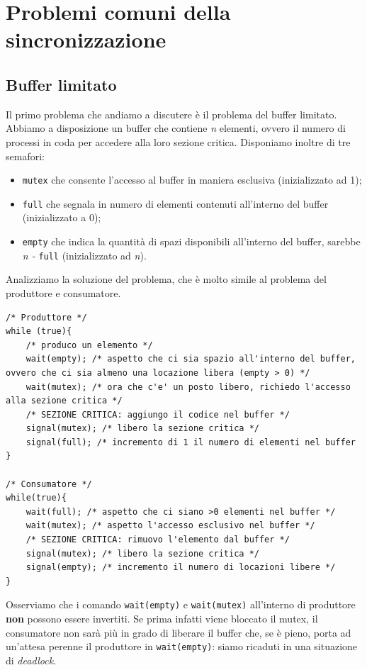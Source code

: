 \section{Problemi comuni della sincronizzazione}


\subsection{Buffer limitato}
Il primo problema che andiamo a discutere è il problema del buffer limitato. Abbiamo a disposizione un buffer che contiene \textit{n} elementi, ovvero il numero di processi in coda per accedere alla loro sezione critica. Disponiamo inoltre di tre semafori:
\vspace{-5px}
\begin{itemize}
\setlength{\itemsep}{-.15 em}
    \item \texttt{mutex} che consente l'accesso al buffer in maniera esclusiva (inizializzato ad 1);
    \item \texttt{full} che segnala in numero di elementi contenuti all'interno del buffer (inizializzato a 0);
    \item \texttt{empty} che indica la quantità di spazi disponibili all'interno del buffer, sarebbe \textit{n - }\texttt{full} (inizializzato ad \textit{n}).
\end{itemize}
Analizziamo la soluzione del problema, che è molto simile al problema del produttore e consumatore.
\begin{lstlisting}[caption = {Problema del buffer limitato}]
/* Produttore */
while (true){
    /* produco un elemento */
    wait(empty); /* aspetto che ci sia spazio all'interno del buffer, ovvero che ci sia almeno una locazione libera (empty > 0) */
    wait(mutex); /* ora che c'e' un posto libero, richiedo l'accesso alla sezione critica */
    /* SEZIONE CRITICA: aggiungo il codice nel buffer */
    signal(mutex); /* libero la sezione critica */
    signal(full); /* incremento di 1 il numero di elementi nel buffer
}

/* Consumatore */
while(true){
    wait(full); /* aspetto che ci siano >0 elementi nel buffer */
    wait(mutex); /* aspetto l'accesso esclusivo nel buffer */
    /* SEZIONE CRITICA: rimuovo l'elemento dal buffer */
    signal(mutex); /* libero la sezione critica */
    signal(empty); /* incremento il numero di locazioni libere */
}
\end{lstlisting}

Osserviamo che i comando \texttt{wait(empty)} e \texttt{wait(mutex)} all'interno di produttore \textbf{non} possono essere invertiti. Se prima infatti viene bloccato il mutex, il consumatore non sarà più in grado di liberare il buffer che, se è pieno, porta ad un'attesa perenne il produttore in \texttt{wait(empty)}: siamo ricaduti in una situazione di \textit{deadlock}.

